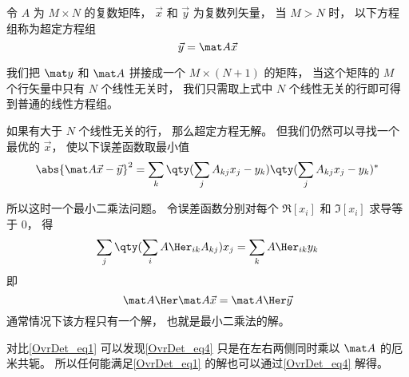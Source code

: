 
令 $A$ 为 $M\times N$ 的复数矩阵， $\vec x$ 和 $\vec y$ 为复数列矢量， 当 $M > N$ 时， 以下方程组称为超定方程组
\begin{equation}\label{OvrDet_eq1}
\vec y = \mat A \vec x
\end{equation}

我们把 $\mat y$ 和 $\mat A$ 拼接成一个 $M\times(N+1)$ 的矩阵， 当这个矩阵的 $M$ 个行矢量中只有 $N$ 个线性无关时， 我们只需取上式中 $N$ 个线性无关的行即可得到普通的线性方程组。

如果有大于 $N$ 个线性无关的行， 那么超定方程无解。 但我们仍然可以寻找一个最优的 $\vec x$， 使以下误差函数取最小值
\begin{equation}
\abs{\mat A\vec x - \vec y}^2 =  \sum_k  \qty(\sum_j A_{kj} x_j - y_k) \qty(\sum_j A_{kj} x_j - y_k)^*
\end{equation}

所以这时一个最小二乘法问题。 令误差函数分别对每个 $\Re[x_i]$ 和 $\Im[x_i]$ 求导等于 0， 得
\begin{equation}
\sum_j \qty(\sum_i A\Her_{ik} A_{kj}) x_j = \sum_k A\Her_{ik} y_k
\end{equation}
即
\begin{equation}\label{OvrDet_eq4}
\mat A\Her \mat A \vec x = \mat A\Her \vec y
\end{equation}
通常情况下该方程只有一个解， 也就是最小二乘法的解。

对比\autoref{OvrDet_eq1} 可以发现\autoref{OvrDet_eq4} 只是在左右两侧同时乘以 $\mat A$ 的厄米共轭。 所以任何能满足\autoref{OvrDet_eq1} 的解也可以通过\autoref{OvrDet_eq4} 解得。
